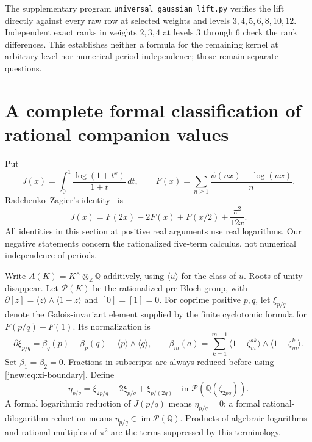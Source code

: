\documentclass[11pt,a4paper]{article}
\theoremstyle{definition}
\theoremstyle{remark}
\numberwithin{equation}{section}
\begin{document}
The supplementary program \texttt{universal\_gaussian\_lift.py}
verifies the lift directly against every raw row at selected weights
and levels $3,4,5,6,8,10,12$. Independent exact ranks in weights
$2,3,4$ at levels $3$ through $6$ check the rank differences. This
establishes neither a formula for the remaining kernel at arbitrary
level nor numerical period independence; those remain separate
questions.
\section{A complete formal classification of rational companion values}
\label{jnew:sec:classification}

Put
\[
 J(x)=\int_0^1\frac{\log(1+t^x)}{1+t}\,dt,
 \qquad
 F(x)=\sum_{n\ge1}\frac{\psi(nx)-\log(nx)}n.
\]
Radchenko--Zagier's identity~\cite{RadchenkoZagier} is
\begin{equation}\label{jnew:eq:JF}
 J(x)=F(2x)-2F(x)+F(x/2)+\frac{\pi^2}{12x}.
\end{equation}
All identities in this section at positive real arguments use real logarithms.
Our negative statements concern the rationalized five-term calculus, not
numerical independence of periods.

Write $A(K)=K^\times\otimes_{\mathbb Z}\mathbb Q$ additively, using
$\langle u\rangle$ for the class of $u$. Roots of unity disappear.
Let $\mathcal P(K)$ be the rationalized pre-Bloch group, with
$\partial[z]=\langle z\rangle\wedge\langle1-z\rangle$ and
$[0]=[1]=0$. For coprime positive $p,q$, let $\xi_{p/q}$ denote the
Galois-invariant element supplied by the finite cyclotomic formula for
$F(p/q)-F(1)$. Its normalization is
\begin{equation}\label{jnew:eq:xi-boundary}
 \partial\xi_{p/q}
 =\beta_q(p)-\beta_p(q)-\langle p\rangle\wedge\langle q\rangle,
 \qquad
 \beta_m(a)=\sum_{k=1}^{m-1}
 \langle1-\zeta_m^{ak}\rangle\wedge\langle1-\zeta_m^k\rangle.
\end{equation}
Set $\beta_1=\beta_2=0$. Fractions in subscripts are always reduced
before using \eqref{jnew:eq:xi-boundary}. Define
\begin{equation}\label{jnew:eq:eta}
 \eta_{p/q}=\xi_{2p/q}-2\xi_{p/q}+\xi_{p/(2q)}
 \quad\text{in }\mathcal P(\mathbb Q(\zeta_{2pq})).
\end{equation}
A formal logarithmic reduction of $J(p/q)$ means $\eta_{p/q}=0$;
a formal rational-dilogarithm reduction means
$\eta_{p/q}\in\operatorname{im}\mathcal P(\mathbb Q)$.
Products of algebraic logarithms and rational multiples of $\pi^2$
are the terms suppressed by this terminology.
\end{document}
